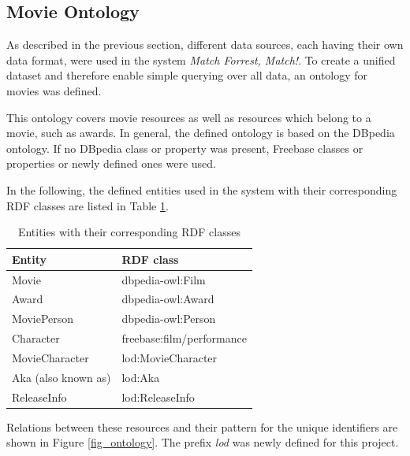 \subsection{Movie Ontology}
\label{subsec_method_ontology}

As described in the previous section, different data sources, each having their own data format, were used in the system \emph{Match Forrest, Match!}.
To create a unified dataset and therefore enable simple querying over all data, an ontology for movies was defined.

This ontology covers movie resources as well as resources which belong to a movie, such as awards.
In general, the defined ontology is based on the DBpedia ontology.
If no DBpedia class or property was present, Freebase classes or properties or newly defined ones were used.

In the following, the defined entities used in the system with their corresponding RDF classes are listed in Table \ref{tab_entities}.

\begin{table}[ht]
	\begin{center}
	\begin{tabular}{ll}
		\textbf{Entity} & \textbf{RDF class} \\ \hline
		Movie & dbpedia-owl:Film \\
		Award & dbpedia-owl:Award \\
		MoviePerson & dbpedia-owl:Person \\
		Character & freebase:film/performance \\
		MovieCharacter & lod:MovieCharacter \\
		Aka (also known as) & lod:Aka \\
		ReleaseInfo & lod:ReleaseInfo \\
	\end{tabular}
	\end{center}
	\caption{Entities with their corresponding RDF classes}
	\label{tab_entities}
\end{table}

Relations between these resources and their pattern for the unique identifiers are shown in Figure \ref{fig_ontology}.
The prefix \textit{lod} was newly defined for this project.

